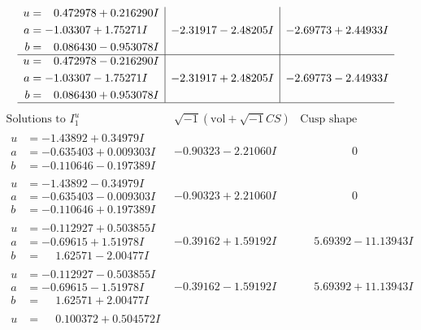 \documentclass[1p]{elsarticle_modified}
\theoremstyle{definition}
\newcommand{\I}{\sqrt{-1}}
\begin{document}
$$\begin{array}{c|c|c}
\begin{aligned}
u &= \phantom{-}0.472978 + 0.216290 I \\
a &= -1.03307 + 1.75271 I \\
b &= \phantom{-}0.086430 - 0.953078 I\end{aligned}
 & -2.31917 - 2.48205 I & -2.69773 + 2.44933 I \\ \hline\begin{aligned}
u &= \phantom{-}0.472978 - 0.216290 I \\
a &= -1.03307 - 1.75271 I \\
b &= \phantom{-}0.086430 + 0.953078 I\end{aligned}
 & -2.31917 + 2.48205 I & -2.69773 - 2.44933 I\\
 \hline 
 \end{array}$$\newpage$$\begin{array}{c|c|c}  
\text{Solutions to }I^u_{1}& \I (\text{vol} + \sqrt{-1}CS) & \text{Cusp shape}\\
 \hline 
\begin{aligned}
u &= -1.43892 + 0.34979 I \\
a &= -0.635403 + 0.009303 I \\
b &= -0.110646 - 0.197389 I\end{aligned}
 & -0.90323 - 2.21060 I & \phantom{-0.000000 } 0 \\ \hline\begin{aligned}
u &= -1.43892 - 0.34979 I \\
a &= -0.635403 - 0.009303 I \\
b &= -0.110646 + 0.197389 I\end{aligned}
 & -0.90323 + 2.21060 I & \phantom{-0.000000 } 0 \\ \hline\begin{aligned}
u &= -0.112927 + 0.503855 I \\
a &= -0.69615 + 1.51978 I \\
b &= \phantom{-}1.62571 - 2.00477 I\end{aligned}
 & -0.39162 + 1.59192 I & \phantom{-}5.69392 - 11.13943 I \\ \hline\begin{aligned}
u &= -0.112927 - 0.503855 I \\
a &= -0.69615 - 1.51978 I \\
b &= \phantom{-}1.62571 + 2.00477 I\end{aligned}
 & -0.39162 - 1.59192 I & \phantom{-}5.69392 + 11.13943 I \\ \hline\begin{aligned}
u &= \phantom{-}0.100372 + 0.504572 I \\

\end{aligned}
\end{array}$$
\end{document}
